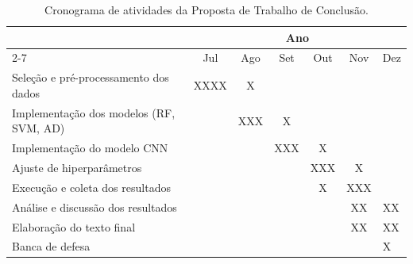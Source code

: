 \begin{table}[htb!]
\centering
\caption{Cronograma de atividades da Proposta de Trabalho de Conclusão.}
\label{tab:cronograma}
\begin{tabular}{|l|llllll|}
\hline
\rowcolor[HTML]{C0C0C0} 
  & \multicolumn{6}{c|}{Ano}                                        \\ 
\cline{2-7} 
\rowcolor[HTML]{C0C0C0} 
\multirow{-2}{*}{Atividades} & \multicolumn{1}{c|}{Jul} & \multicolumn{1}{c|}{Ago} & \multicolumn{1}{c|}{Set} & \multicolumn{1}{c|}{Out} & \multicolumn{1}{c|}{Nov} & Dez \\ \hline
Seleção e pré-processamento dos dados & \multicolumn{1}{c|}{XXXX} & \multicolumn{1}{c|}{X} & \multicolumn{1}{c|}{} & \multicolumn{1}{c|}{} & \multicolumn{1}{c|}{} & \\
\hline
Implementação dos modelos (RF, SVM, AD) & \multicolumn{1}{c|}{} & \multicolumn{1}{c|}{XXX} & \multicolumn{1}{c|}{X} & \multicolumn{1}{c|}{} & \multicolumn{1}{c|}{} & \\
\hline
Implementação do modelo CNN & \multicolumn{1}{c|}{} & \multicolumn{1}{c|}{} & \multicolumn{1}{c|}{XXX} & \multicolumn{1}{c|}{X} & \multicolumn{1}{c|}{} & \\
\hline
Ajuste de hiperparâmetros & \multicolumn{1}{c|}{} & \multicolumn{1}{c|}{} & \multicolumn{1}{c|}{} & \multicolumn{1}{c|}{XXX} & \multicolumn{1}{c|}{X} & \\
\hline
Execução e coleta dos resultados & \multicolumn{1}{c|}{} & \multicolumn{1}{c|}{} & \multicolumn{1}{c|}{} & \multicolumn{1}{c|}{X} & \multicolumn{1}{c|}{XXX} & \\
\hline
Análise e discussão dos resultados & \multicolumn{1}{c|}{} & \multicolumn{1}{c|}{} & \multicolumn{1}{c|}{} & \multicolumn{1}{c|}{} & \multicolumn{1}{c|}{XX} & XX \\
\hline
Elaboração do texto final & \multicolumn{1}{c|}{} & \multicolumn{1}{c|}{} & \multicolumn{1}{c|}{} & \multicolumn{1}{c|}{} & \multicolumn{1}{c|}{XX} & XX \\
\hline
Banca de defesa & \multicolumn{1}{c|}{} & \multicolumn{1}{c|}{} & \multicolumn{1}{c|}{} & \multicolumn{1}{c|}{} & \multicolumn{1}{c|}{} & X \\
\hline
\end{tabular}
\end{table}